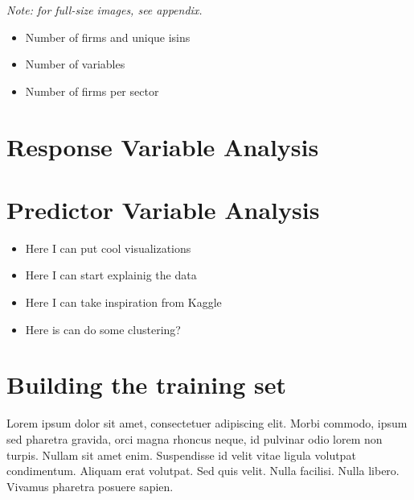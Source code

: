 \noindent \textit{Note: for full-size images, see appendix.}
\newpage

\begin{itemize}
    \item Number of firms and unique isins
    \item Number of variables
    \item Number of firms per sector
\end{itemize}

\section{Response Variable Analysis}

\section{Predictor Variable Analysis}
\begin{itemize}
    \item Here I can put cool visualizations
    \item Here I can start explainig the data
    \item Here I can take inspiration from Kaggle
    \item Here is can do some clustering?
\end{itemize}
\section{Building the training set}

    
Lorem ipsum dolor sit amet, consectetuer adipiscing elit. Morbi commodo, ipsum sed pharetra gravida, orci magna rhoncus neque, id pulvinar odio lorem non turpis. Nullam sit amet enim. Suspendisse id velit vitae ligula volutpat condimentum. Aliquam erat volutpat. Sed quis velit. Nulla facilisi. Nulla libero. Vivamus pharetra posuere sapien. 